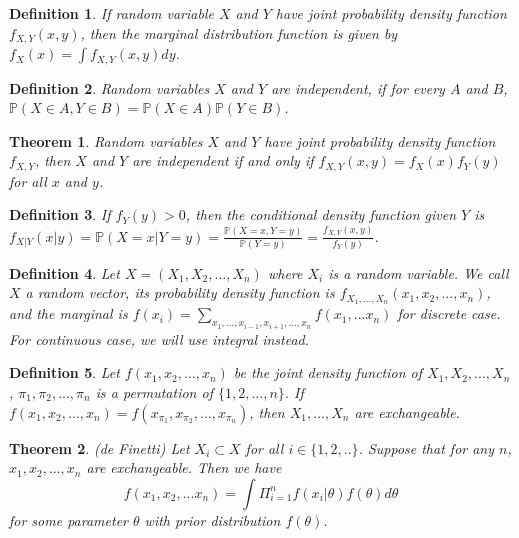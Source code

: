 \documentclass[11pt]{article}
\def\BP{{\bf P}}
\def\BP{{\mathbb P}}
\newtheorem{theorem}{Theorem}[section]
\newtheorem{definition}{Definition}[section]
\begin{document}
\begin{definition}
If random variable $X$ and $Y$ have joint probability density function $f_{X,Y}(x, y)$, then the marginal distribution function is given by $f_X(x) = \int f_{X, Y}(x, y) dy$.
\end{definition}

\begin{definition}
Random variables $X$ and $Y$ are independent, if for every $A$ and $B$, $\BP(X\in A, Y\in B) = \BP(X\in A)\BP(Y\in B)$.
\end{definition}

\begin{theorem}
Random variables $X$ and $Y$ have joint probability density function $f_{X,Y}$, then $X$ and $Y$ are independent if and only if $f_{X,Y}(x,y) = f_X(x) f_Y(y)$ for all $x$ and $y$.
\end{theorem}

\begin{definition}
If $f_Y(y) > 0$, then the conditional density function given $Y$ is $f_{X|Y}(x | y) = \BP(X = x| Y = y) = \frac{\BP(X=x, Y= y)}{\BP(Y= y)} = \frac{f_{X,Y}(x, y)}{f_Y(y)}$.
\end{definition}

\begin{definition}
Let $X = (X_1, X_2, ..., X_n)$ where $X_i$ is a random variable. We call $X$ a random vector, its probability density function is $f_{X_1, ..., X_n}(x_1, x_2, ..., x_n)$, and the marginal is $f(x_i)= \sum_{x_1, ..., x_{i-1}, x_{i+1}, ..., x_n} f(x_1, ... x_n)$ for discrete case. For continuous case, we will use integral instead.
\end{definition}

\begin{definition}
Let $f(x_1, x_2, ..., x_n)$ be the joint density function of $X_1, X_2, ..., X_n$, $\pi_1, \pi_2, ..., \pi_n$ is a permutation of $\{1, 2, ..., n\}$. If $f(x_1, x_2, ..., x_n) = f(x_{\pi_1}, x_{\pi_2}, ..., x_{\pi_n})$, then $X_1, ..., X_n$ are exchangeable.
\end{definition}

\begin{theorem}(de Finetti)
Let $X_i \subset X$ for all $i\in\{1, 2, ..\}$. Suppose that for any $n$, $x_1, x_2, ..., x_n$ are exchangeable. Then we have \[f(x_1, x_2, ... x_n) = \int \Pi_{i=1}^n f(x_i | \theta) f(\theta) d\theta\] for some parameter $\theta$ with prior distribution $f(\theta)$.
\end{theorem}
\end{document}
